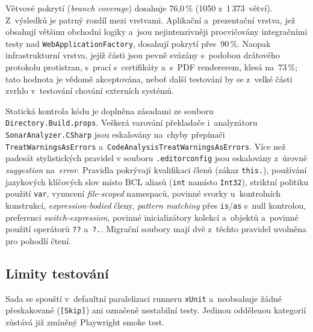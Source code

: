 Větvové pokrytí (\emph{branch coverage}) dosahuje 76{,}0\,\% (1050 z~1\,373~větví).
Z~výsledků je patrný rozdíl mezi vrstvami.
Aplikační a~prezentační vrstva, jež obsahují většinu obchodní logiky a~jsou nejintenzivněji procvičovány integračními testy nad \texttt{WebApplicationFactory}, dosahují pokrytí přes~90\,\%.
Naopak infrastrukturní vrstva, jejíž části jsou pevně svázány s~podobou drátového protokolu protistran, s~prací s~certifikáty a~s~PDF rendererem, klesá na~73\,\%; tato hodnota je vědomě akceptována, neboť další testování by se z~velké části zvrhlo v~testování chování externích systémů.

Statická kontrola kódu je doplněna zásadami ze souboru \texttt{Directory.Build.props}.
Veškerá varování překladače i~analyzátoru \texttt{SonarAnalyzer.CSharp} jsou eskalovány na~chyby přepínači \texttt{TreatWarningsAsErrors} a~\texttt{CodeAnalysisTreatWarningsAsErrors}.
Více než padesát stylistických pravidel v souboru \texttt{.editorconfig} jsou eskalovány z~úrovně \emph{suggestion} na~\emph{error}.
Pravidla pokrývají kvalifikaci členů (zákaz \texttt{this.}), používání jazykových klíčových slov místo BCL aliasů (\texttt{int} namísto \texttt{Int32}), striktní politiku použití \texttt{var}, vynucení \emph{file-scoped} namespaců, povinné svorky u~kontrolních konstrukcí, \emph{expression-bodied} členy, \emph{pattern matching} přes \texttt{is}/\texttt{as} s~null kontrolou, preferenci \emph{switch-expression}, povinné inicializátory kolekcí a~objektů a~povinné použití operátorů \texttt{??} a~\texttt{?.}.
Migrační soubory mají dvě z~těchto pravidel uvolněna pro pohodlí čtení.

\subsection{Limity testování}
\label{subsec:test-limits}

Sada se spouští v~defaultní paralelizaci runneru \texttt{xUnit} a~neobsahuje žádné přeskakované (\texttt{[Skip]}) ani označeně nestabilní testy.
Jedinou oddělenou kategorií zůstává již zmíněný Playwright smoke test.

